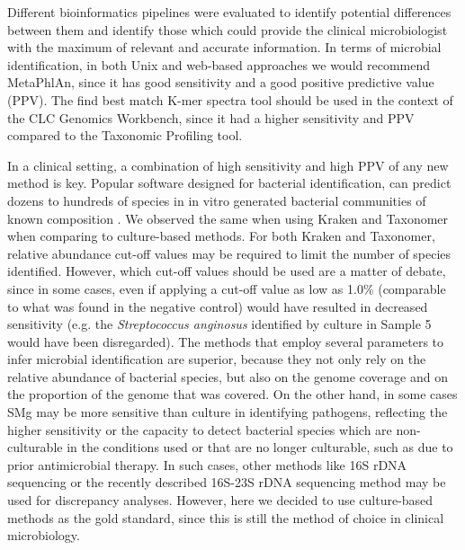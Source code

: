 Different bioinformatics pipelines were evaluated to identify potential differences between them and identify those which could provide the clinical microbiologist with the maximum of relevant and accurate information. In terms of microbial identification, in both Unix and web-based approaches we would recommend MetaPhlAn, since it has good sensitivity and a good positive predictive value (PPV). The find best match K-mer spectra tool should be used in the context of the CLC Genomics Workbench, since it had a higher sensitivity and PPV compared to the Taxonomic Profiling tool.

In a clinical setting, a combination of high sensitivity and high PPV of any new method is key. Popular software designed for bacterial identification, can predict dozens to hundreds of species in in vitro generated bacterial communities of known composition \citep{peabody_evaluation_2015}. We observed the same when using Kraken and Taxonomer when comparing to culture-based methods. For both Kraken and Taxonomer, relative abundance cut-off values may be required to limit the number of species identified. However, which cut-off values should be used are a matter of debate, since in some cases, even if applying a cut-off value as low as 1.0\% (comparable to what was found in the negative control) would have resulted in decreased sensitivity (e.g. the \textit{Streptococcus anginosus} identified by culture in Sample 5 would have been disregarded). The methods that employ several parameters to infer microbial identification are superior, because they not only rely on the relative abundance of bacterial species, but also on the genome coverage and on the proportion of the genome that was covered. On the other hand, in some cases \ac{SMg} may be more sensitive than culture in identifying pathogens, reflecting the higher sensitivity or the capacity to detect bacterial species which are non-culturable in the conditions used or that are no longer culturable, such as due to prior antimicrobial therapy. In such cases, other methods like 16S rDNA sequencing or the recently described 16S-23S rDNA sequencing method \citep{sabat_targeted_2017} may be used for discrepancy analyses. However, here we decided to use culture-based methods as the gold standard, since this is still the method of choice in clinical microbiology.

